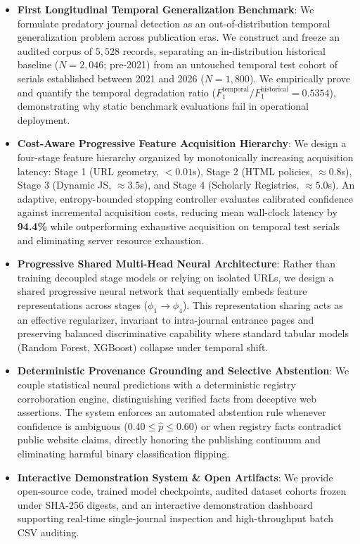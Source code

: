 \documentclass[journal]{IEEEtran}
\begin{document}
\begin{itemize}
    \item \textbf{First Longitudinal Temporal Generalization Benchmark}: We formulate predatory journal detection as an out-of-distribution temporal generalization problem across publication eras. We construct and freeze an audited corpus of $5,528$ records, separating an in-distribution historical baseline ($N=2,046$; pre-2021) from an untouched temporal test cohort of serials established between 2021 and 2026 ($N=1,800$). We empirically prove and quantify the temporal degradation ratio ($F_1^{\text{temporal}} / F_1^{\text{historical}} = 0.5354$), demonstrating why static benchmark evaluations fail in operational deployment.
    \item \textbf{Cost-Aware Progressive Feature Acquisition Hierarchy}: We design a four-stage feature hierarchy organized by monotonically increasing acquisition latency: Stage 1 (URL geometry, $<0.01$s), Stage 2 (HTML policies, $\approx 0.8$s), Stage 3 (Dynamic JS, $\approx 3.5$s), and Stage 4 (Scholarly Registries, $\approx 5.0$s). An adaptive, entropy-bounded stopping controller evaluates calibrated confidence against incremental acquisition costs, reducing mean wall-clock latency by \textbf{94.4\%} while outperforming exhaustive acquisition on temporal test serials and eliminating server resource exhaustion.
    \item \textbf{Progressive Shared Multi-Head Neural Architecture}: Rather than training decoupled stage models or relying on isolated URLs, we design a shared progressive neural network that sequentially embeds feature representations across stages ($\phi_1 \to \phi_4$). This representation sharing acts as an effective regularizer, invariant to intra-journal entrance pages and preserving balanced discriminative capability where standard tabular models (Random Forest, XGBoost) collapse under temporal shift.
    \item \textbf{Deterministic Provenance Grounding and Selective Abstention}: We couple statistical neural predictions with a deterministic registry corroboration engine, distinguishing verified facts from deceptive web assertions. The system enforces an automated abstention rule whenever confidence is ambiguous ($0.40 \le \hat{p} \le 0.60$) or when registry facts contradict public website claims, directly honoring the publishing continuum and eliminating harmful binary classification flipping.
    \item \textbf{Interactive Demonstration System \& Open Artifacts}: We provide open-source code, trained model checkpoints, audited dataset cohorts frozen under SHA-256 digests, and an interactive demonstration dashboard supporting real-time single-journal inspection and high-throughput batch CSV auditing.
\end{itemize}
\end{document}

